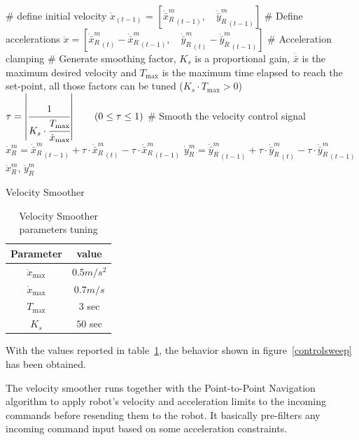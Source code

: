 \begin{algorithm}[H]
	\# define initial velocity\;
	$\dot{x}_{(t-1)}$ = $\left[{\dot{\bar{x}}_R^m}_{(t-1)},\quad {\dot{\bar{y}}_R^m}_{(t-1)}\right]$\;
	\# Define accelerations\;
	$\ddot{x}= \left[ {\dot{\bar{x}}_R^m}_{(t)}-{\dot{\bar{x}}_R^m}_{(t-1)},\quad {\dot{\bar{y}}_R^m}_{(t)}-{\dot{\bar{y}}_R^m}_{(t-1)}\right]$\;
	\# Acceleration clamping \;
	\# Generate smoothing factor, $K_s$ is a proportional gain, $\dot{\bar{x}}$ is the maximum desired velocity and $T_\text{max}$ is the maximum time elapsed to reach the set-point, all those factors can be tuned ($K_s\cdot T_\text{max} > 0 $)\;
	$\tau = \left| \cfrac{1}{K_s\cdot\cfrac{T_\text{max}}{\dot{x}_{\text{max}}}}\right|\qquad(0\leq\tau\leq1)$\;
	\# Smooth the velocity control signal\;
	${\dot{x}_R^m} = {\dot{\bar{x}}_R^m}_{(t-1)}+\tau\cdot{\dot{\bar{x}}_R^m}_{(t)}-\tau\cdot{\dot{\bar{x}}_R^m}_{(t-1)}$ \;
	${\dot{y}_R^m} = {\dot{\bar{y}}_R^m}_{(t-1)}+\tau\cdot{\dot{\bar{y}}_R^m}_{(t)}-\tau\cdot{\dot{\bar{y}}_R^m}_{(t-1)}$ \;
	\Return $\dot{x}_R^m$, $\dot{y}_R^m$
	\caption{Velocity Smoother} 
	\label{smoother}
\end{algorithm}
\begin{table}[h]
	\begin{center}
		\begin{tabular}{|c|c|}
			\hline
			Parameter & value\\
			\hline
			$\ddot{x}_{\text{max}}$  & $0.5m/s^2$\\
			\hline
			$\dot{x}_{\text{max}}$  & $0.7m/s$\\
			\hline
			$T_{\text{max}}$  & $3$ sec\\
			\hline
			$K_s$  & $50$ sec\\
			\hline
		\end{tabular}
	\end{center}
	\caption{Velocity Smoother parameters tuning}
	\label{parsmoother}
\end{table}
With the values reported in table~\ref{parsmoother}, the behavior shown in figure~\ref{controlsweep} has been obtained. 

The velocity smoother runs together with the Point-to-Point Navigation algorithm to apply robot's velocity and acceleration limits to the incoming commands before resending them to the robot. It basically pre-filters any incoming command input based on some acceleration constraints. 

